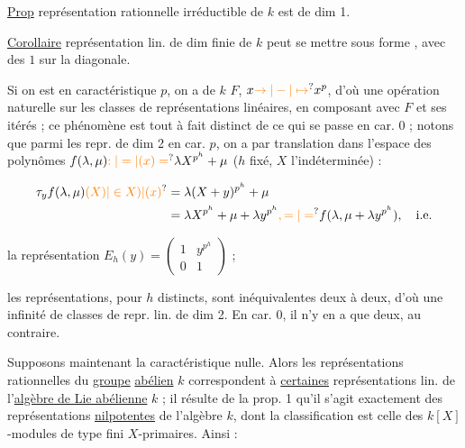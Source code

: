 \uline{Prop}  représentation  rationnelle irréductible de $k$ est de dim 1.

\uline{Corollaire}  représentation lin.  de dim finie de $k$ peut se mettre sous forme , avec des $1$ sur la diagonale.

Si on est en caractéristique $p$, on a    de $k$  $F$, $x\unsure{\to|-|\mapsto}x^p$,  d'où une opération naturelle sur les classes de représentations linéaires, en composant avec $F$ et ses itérés ; ce phénomène est tout à fait distinct de ce qui se passe en car. 0 ; notons que parmi les repr. de dim 2 en car. $p$, on a   par  translation dans l'espace des polynômes $f(\lambda,\mu)\unsure{:|=|(x)=}\lambda X^{p^h}+\mu$ ($h$ fixé, $X$ l'indéterminée) :

\[\begin{aligned}\tau_y f(\lambda,\mu)\unsure{(X)|\in X)|(x)} &= \lambda(X+y)^{p^h}+\mu\\ &=\lambda X^{p^h}+\mu+\lambda y^{p^h}\unsure{,=|=}f(\lambda,\mu+\lambda y^{p^h}),\quad \text{i.e.}\end{aligned}\]

la représentation $E_h(y)=\begin{pmatrix}1&y^{p^h}\\0&1\end{pmatrix}$ ;

les représentations, pour   $h$ distincts, sont inéquivalentes deux à deux, d'où une infinité de classes de repr. lin. de dim 2. En car. 0, il n'y en a que deux, au contraire.



Supposons maintenant la caractéristique nulle. Alors les représentations  rationnelles du \uline{groupe} \uline{abélien} $k$ correspondent à \uline{certaines} représentations lin. de l'\uline{algèbre de Lie abélienne} $k$ ; il résulte de la  prop. 1 qu'il s'agit exactement des représentations \uline{nilpotentes} de l'algèbre $k$, dont la classification est celle des $k[X]$-modules de type fini $X$-primaires. Ainsi :

